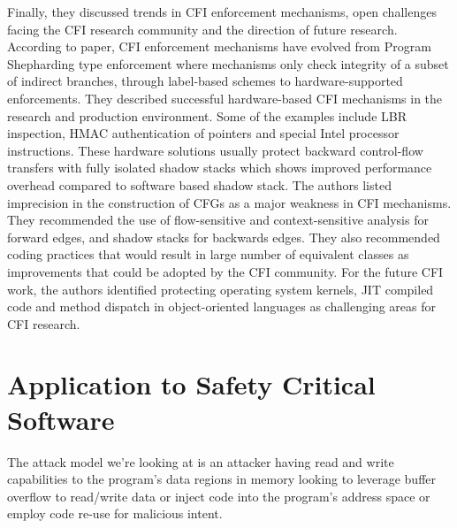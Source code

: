 \documentclass[dvips,12pt]{article}
\begin{document}
Finally, they discussed trends in CFI enforcement mechanisms, open challenges facing the CFI research community and the direction of future research. According to paper, CFI enforcement mechanisms have evolved from Program Shepharding type enforcement where mechanisms only check integrity of a subset of indirect branches, through label-based schemes to hardware-supported enforcements. They described successful hardware-based CFI mechanisms in the research and production environment. Some of the examples include LBR inspection, HMAC authentication of pointers and special Intel processor instructions. These hardware solutions usually protect backward control-flow transfers with fully isolated shadow stacks which shows improved performance overhead compared to software based shadow stack. The authors listed imprecision in the construction of CFGs as a major weakness in CFI mechanisms. They recommended the use of flow-sensitive and context-sensitive analysis for forward edges, and shadow stacks for backwards edges. They also recommended coding practices that would result in large number of equivalent classes as improvements that could be adopted by the CFI community.     For the future CFI work, the authors identified protecting operating system kernels, JIT compiled code and method dispatch in object-oriented languages as challenging areas for CFI research.

\section{Application to Safety Critical Software}
The attack model we're looking at is an attacker having read and write capabilities to the program's data regions in memory looking to leverage buffer overflow to read/write data or inject code into the program's address space or employ code re-use for malicious intent.










 





\end{document}
